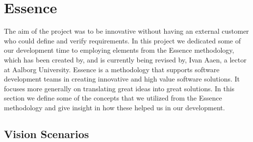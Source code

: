 
\section{Essence}
\label{sec:essence}

The aim of the project was to be innovative without having an external customer who could define and verify requirements. In this project we dedicated some of our development time to employing elements from the Essence methodology, which has been created by, and is currently being revised by, Ivan Aaen, a lector at Aalborg University. Essence is a methodology that supports software development teams in creating innovative and high value software solutions. It focuses more generally on translating great ideas into great solutions. In this section we define some of the concepts that we utilized from the Essence methodology and give insight in how these helped us in our development.





\subsection{Vision Scenarios}
\label{sub:essence_vision_scenarios}

